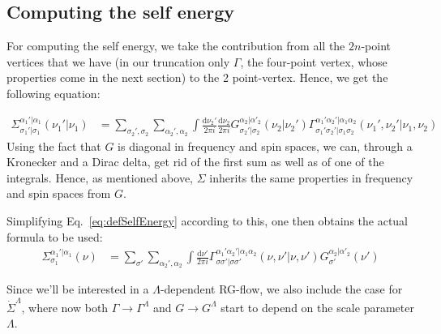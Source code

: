 \documentclass[12pt,a4paper,roman]{article}
\newcommand{\dd}{\mathrm{d}}
\begin{document}
\subsection*{Computing the self energy}
For computing the self energy, we take the contribution from all the $2n$-point vertices that we have (in our truncation only $\Gamma$, the four-point vertex, whose properties come in the next section) to the 2 point-vertex. Hence, we get the following equation:

\begin{align}
\Sigma^{\alpha_1'|\alpha_1}_{\sigma_1'|\sigma_{1}}(\nu_1'|\nu_1) &= \sum_{\sigma_2', \sigma_2}\sum_{\alpha_2', \alpha_2} \int \frac{\dd\nu_2'}{2\pi i} \frac{\dd\nu_2}{2\pi i} G^{\alpha_2|\alpha'_2}_{\sigma_2'|\sigma_2}(\nu_2| \nu_2') \Gamma_{\sigma_1'\sigma_2'|\sigma_1\sigma_2}^{\alpha_1'\alpha_2'|\alpha_1\alpha_2}(\nu_1', \nu_2'| \nu_1, \nu_2)
\label{eq:defSelfEnergy}
\end{align}
Using the fact that $G$ is diagonal in frequency and spin spaces, we can, through a Kronecker and a Dirac delta, get rid of the first sum as well as of one of the integrals. Hence, as mentioned above, $\Sigma$ inherits the same properties in frequency and spin spaces from $G$.

Simplifying Eq.~\eqref{eq:defSelfEnergy} according to this, one then obtains the actual formula to be used:
\begin{align}
\Sigma^{\alpha_1'|\alpha_1}_{\sigma_1}(\nu) &= \sum_{\sigma'} \sum_{\alpha_2', \alpha_2} \int \frac{\dd\nu'}{2\pi i} \Gamma_{\sigma\sigma'|\sigma\sigma'}^{\alpha_1'\alpha_2'|\alpha_1\alpha_2}(\nu, \nu'| \nu, \nu')G^{\alpha_2|\alpha'_2}_{\sigma'}(\nu')
\label{eq:actualSelfEnergy}
\end{align}

Since we'll be interested in a $\Lambda$-dependent RG-flow, we also include the case for $\dot{\Sigma}^\Lambda$, where now both $\Gamma \rightarrow \Gamma^\Lambda$ and $G \rightarrow G^\Lambda$ start to depend on the scale parameter $\Lambda$. 
\end{document}
